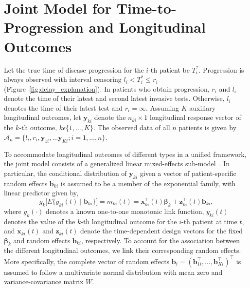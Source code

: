 \section{Joint Model for Time-to-Progression and Longitudinal Outcomes}
\label{sec:jointmodel}
Let the true time of disease progression for the ${i\mbox{-th}}$ patient be $T_i^*$. Progression is always observed with interval censoring ${l_i < T_i^* \leq r_i}$ (Figure~\ref{fig:delay_explanation}). In patients who obtain progression, $r_i$ and $l_i$ denote the time of their latest and second latest invasive tests. Otherwise, $l_i$ denotes the time of their latest test and ${r_i=\infty}$. Assuming $K$ auxiliary longitudinal outcomes, let $\boldsymbol{y}_{ki}$ denote the ${n_{ki} \times 1}$ longitudinal response vector of the ${k\mbox{-th}}$ outcome, $k\epsilon\{1, \ldots, K\}$. The observed data of all $n$ patients is given by ${\mathcal{A}_n = \{l_i, r_i, \boldsymbol{y}_{1i},\ldots \boldsymbol{y}_{Ki}; i = 1, \ldots, n\}}$.

To accommodate longitudinal outcomes of different types in a unified framework, the joint model consists of a generalized linear mixed-effects sub-model~\citep{laird1982random}. In particular, the conditional
distribution of $\boldsymbol{y}_{ki}$ given a vector of patient-specific random effects $\boldsymbol{b}_{ki}$ is assumed to be a member of the exponential family, with linear predictor given by,
\begin{equation}
\label{eq:long_model}
g_k\big[E\{y_{ki} (t) \mid \boldsymbol{b}_{ki}\}\big] = m_{ki}(t) = \boldsymbol{x}_{ki}^{\top}(t)\boldsymbol{\beta}_{k} + \boldsymbol{z}_{ki}^{\top}(t)\boldsymbol{b}_{ki},
\end{equation}
where $g_k(\cdot)$ denotes a known one-to-one monotonic link function, $y_{ki}(t)$ denotes the
value of the ${k\mbox{-th}}$ longitudinal outcome for the ${i\mbox{-th}}$ patient at time $t$, and $\boldsymbol{x}_{ki}(t)$ and $\boldsymbol{z}_{ki}(t)$ denote the time-dependent design vectors for the fixed $\boldsymbol{\beta}_{k}$ and random effects $\boldsymbol{b}_{ki}$, respectively. To account for the association between the different longitudinal outcomes, we link their corresponding random effects. More specifically, the complete vector of random effects ${\boldsymbol{b}_{i} = (\boldsymbol{b}_{1i}^{\top}, \ldots, \boldsymbol{b}_{Ki}^{\top})^{\top}}$ is assumed to follow a multivariate normal distribution with mean zero and variance-covariance matrix $W$.

